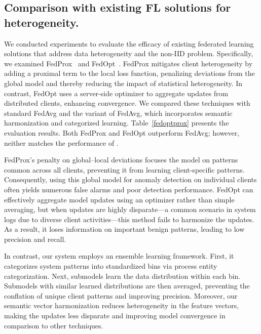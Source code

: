 \subsection{Comparison with existing FL solutions for heterogeneity.}
\label{sec:fedalternatives}

We conducted experiments to evaluate the efficacy of existing federated learning solutions that address data heterogeneity and the non-IID problem. Specifically, we examined FedProx~\cite{li2020federated} and FedOpt~\cite{asad2020fedopt}. FedProx mitigates client heterogeneity by adding a proximal term to the local loss function, penalizing deviations from the global model and thereby reducing the impact of statistical heterogeneity. In contrast, FedOpt uses a server-side optimizer to aggregate updates from distributed clients, enhancing convergence. We compared these techniques with standard FedAvg and the \Sys variant of FedAvg, which incorporates semantic harmonization and categorized learning. Table~\ref{fedoptprox} presents the evaluation results. Both FedProx and FedOpt outperform FedAvg; however, neither matches the performance of \Sys.

FedProx’s penalty on global--local deviations focuses the model on patterns common across all clients, preventing it from learning client-specific patterns. Consequently, using this global model for anomaly detection on individual clients often yields numerous false alarms and poor detection performance. FedOpt can effectively aggregate model updates using an optimizer rather than simple averaging, but when updates are highly disparate---a common scenario in system logs due to diverse client activities---this method fails to harmonize the updates. As a result, it loses information on important benign patterns, leading to low precision and recall.

In contrast, our system employs an ensemble learning framework. First, it categorizes system patterns into standardized bins via process entity categorization. Next, \gnnshort submodels learn the data distribution within each bin. Submodels with similar learned distributions are then averaged, preventing the conflation of unique client patterns and improving precision. Moreover, our semantic vector harmonization reduces heterogeneity in the \gnnshort feature vectors, making the updates less disparate and improving model convergence in comparison to other techniques.
 

